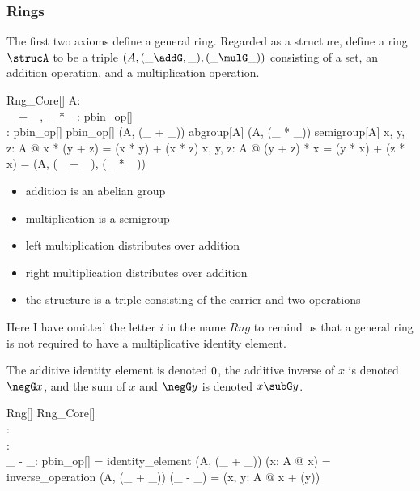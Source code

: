 \documentclass{amsart}
\begin{document}
\subsubsection{Rings}

The first two axioms define a general ring.
Regarded as a structure, define a ring $\strucA$ to be a triple $(A, (\_ \addG, \_), (\_ \mulG \_))$ 
consisting of a set, an addition operation, and a multiplication operation.

\begin{schema}{Rng\_Core}[\genT]
	A: \power \genT \\
	\_ + \_, \_ * \_: pbin\_op[\genT] \\
	\strucA: \power \genT \cross pbin\_op[\genT] \cross pbin\_op[\genT]
\where
	(A, (\_ + \_)) \in abgroup[A]
\also
	(A, (\_ * \_)) \in semigroup[A]
\also
	\forall x, y, z: A @ x * (y + z) = (x * y) + (x * z)
\also
	\forall x, y, z: A @ (y + z) * x  = (y * x) + (z * x)
\also
	\strucA = (A, (\_ + \_), (\_ * \_))
\end{schema}

\begin{itemize}
	\item addition is an abelian group
	\item multiplication is a semigroup
	\item left multiplication distributes over addition
	\item right multiplication distributes over addition
	\item the structure is a triple consisting of the carrier and two operations
\end{itemize}

Here I have omitted the letter \textit{i} in the name $Rng$ to remind us that
a general ring is not required to have a multiplicative identity element.

The additive identity element is denoted $0$, 
the additive inverse of $x$ is denoted $\negG x$, and
the sum of $x$ and $\negG y$ is denoted $x \subG y$.

\begin{schema}{Rng}[\genT]
	Rng\_Core[\genT] \\
	\zeroRng: \genT \\
	\negG: \genT \pfun \genT \\
	\_ - \_: pbin\_op[\genT]
\where
	\zeroRng = identity\_element (A, (\_ + \_))
\also
	(\lambda x: A @ \negG x) = inverse\_operation (A, (\_ + \_))
\also
	(\_ - \_) = (\lambda x, y: A @ x + (\negG y))
\end{schema}
\end{document}
